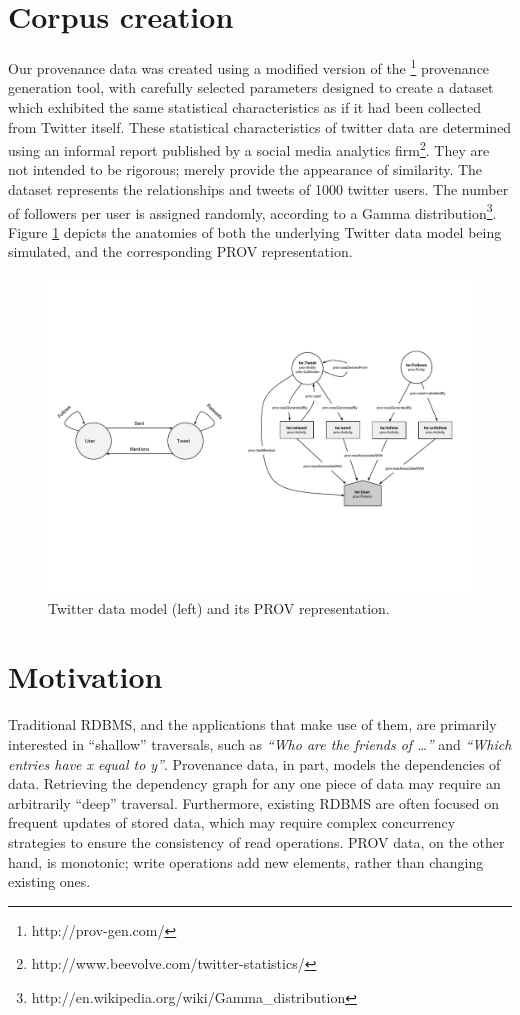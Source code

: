 \documentclass{llncs}
\begin{document}
\section{Corpus creation}
%
Our provenance data was created using a modified version of the \provGen{}\footnote{http://prov-gen.com/} provenance generation tool, with carefully selected parameters designed to create a dataset which exhibited the same statistical characteristics as if it had been collected from Twitter itself.
%
These statistical characteristics of twitter data are determined using an informal report published by a social media analytics firm\footnote{http://www.beevolve.com/twitter-statistics/}.
%
They are not intended to be rigorous; merely provide the appearance of similarity.
%
The dataset represents the relationships and tweets of 1000 twitter users.
%
The number of followers per user is assigned randomly, according to a Gamma distribution\footnote{http://en.wikipedia.org/wiki/Gamma\_distribution}.
%
Figure \ref{fig:datamodel} depicts the anatomies of both the underlying Twitter data model being simulated, and the corresponding PROV representation.
%
\begin{figure}
    \includegraphics[width=1.1\textwidth]{figures/data_model}
    \caption{Twitter data model (left) and its PROV representation.}
    \label{fig:datamodel}
\end{figure}

%
\section{Motivation}
%
Traditional RDBMS, and the applications that make use of them, are primarily interested in ``shallow'' traversals, such as \textit{``Who are the friends of \ldots''} and \textit{``Which entries have x equal to y''}.
%
Provenance data, in part, models the dependencies of data.
%
Retrieving the dependency graph for any one piece of data may require an arbitrarily ``deep'' traversal.
%
Furthermore, existing RDBMS are often focused on frequent updates of stored data, which may require complex concurrency strategies to ensure the consistency of read operations. 
%
PROV data, on the other hand, is monotonic; write operations add new elements, rather than changing existing ones. 
%
\end{document}
